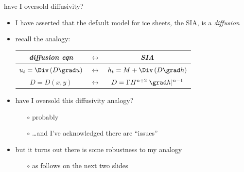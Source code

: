 \begin{frame}{have I oversold diffusivity?} 

\begin{itemize}
\item I have asserted that the default model for ice sheets, the SIA, is a \emph{diffusion}
\item recall the analogy:

\bigskip
\begin{tabular}{ccc}
\emph{diffusion eqn} & $\leftrightarrow$ & \emph{SIA} \\ \hline
$u_t = \Div\left(D \grad u\right)$ & $\leftrightarrow$ & $h_t = M + \Div\left(D \grad h\right)$ \\
$D=D(x,y)$ & $\leftrightarrow$ & $D = \Gamma H^{n+2} |\grad h|^{n-1}$ \\
\end{tabular}

\bigskip
\item have I oversold this diffusivity analogy?
  \begin{itemize}
  \item[$\circ$] probably
  \item[$\circ$] \dots and I've acknowledged there are ``issues''
  \end{itemize}
\item but it turns out there is some robustness to my analogy
  \begin{itemize}
  \item[$\circ$] as follows on the next two slides
  \end{itemize}

\end{itemize}
\end{frame}


